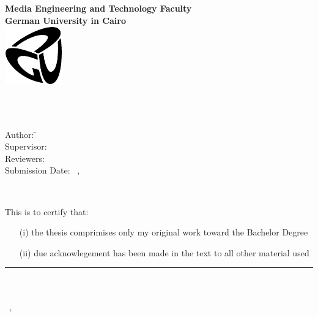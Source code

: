 \newpage
\thispagestyle{empty}
\begin{center}
	\textbf{Media Engineering and Technology Faculty}\\[1mm]
	\textbf{German University in Cairo}\\[1mm]
	\includegraphics[width=2.5cm]{GUC-logo-ss.ps}
	
	\vspace{2cm}
	{\Huge \textbf{\titleOfThesisOne}}\\
	\vspace{2cm}
	{\large \textbf{\typeOfThesis}}\\
	
	\vspace{8cm}
	\parbox{1cm}{
  		\begin{large}
    			\begin{tabbing}
       			Author: \hspace{2cm}
        			\=\authorOfThesis\\[2mm]
      			Supervisor: 
        			\>\supervisorOne\\[2mm]
        		Reviewers: 
				\>\reviewerOne\\[1mm]
      			Submission Date: 
        			\>\submissionDay~\submissionMonth,~\submissionYear\\
    			\end{tabbing}
  		\end{large}
	}\\
\end{center}

\newpage
\thispagestyle{empty}
This is to certify that:
\begin{itemize}
\item[(i)] the thesis comprimises only my original work toward the Bachelor Degree
\item[(ii)] due acknowlegement has been made in the text to all other material used
\end{itemize}

\vspace{2cm}
\begin{flushright}
\rule[0mm]{6cm}{0.2mm}\\
\authorOfThesis\\
\submissionDay~\submissionMonth,~\submissionYear\\
\end{flushright}